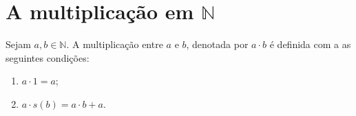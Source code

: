 \documentclass[../main.tex]{subfiles}
\begin{document}


\section{A multiplicação em $\mathbb{N}$}
\begin{defi}\label{nat-def-produto}
    Sejam $a, b \in \mathbb{N}$. A multiplicação entre $a$ e $b$, denotada por $a \cdot b$ é definida com a as seguintes condições: 
	\begin{enumerate}[label=(\roman*)]
		\item $a \cdot 1 = a$;
		\item $a \cdot s(b) = a \cdot b + a$.
	\end{enumerate}
\end{defi}
\end{document}

